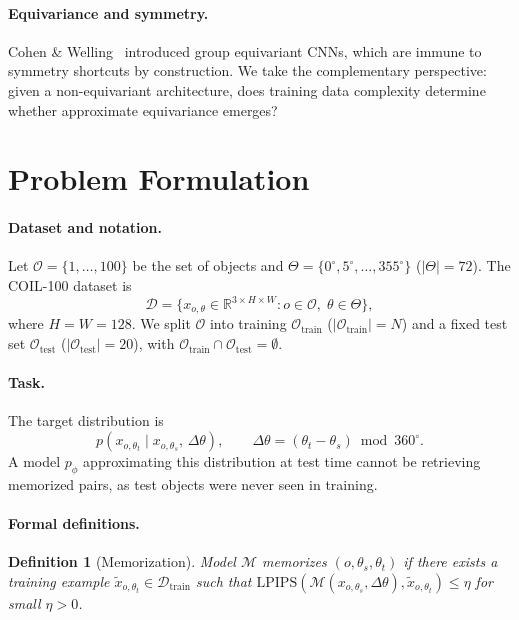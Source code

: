 \documentclass[11pt]{article}
\newtheorem{definition}{Definition}
\newcommand{\R}{\mathbb{R}}
\newcommand{\cO}{\mathcal{O}}
\newcommand{\cD}{\mathcal{D}}
\newcommand{\Dtheta}{\Delta\theta}
\newcommand{\lpips}{\mathrm{LPIPS}}
\begin{document}
\paragraph{Equivariance and symmetry.}
Cohen \& Welling~\cite{cohen2016gcnn} introduced group equivariant CNNs, which
are immune to symmetry shortcuts by construction. We take the complementary
perspective: given a non-equivariant architecture, does training data complexity
determine whether approximate equivariance emerges?

\section{Problem Formulation}
\label{sec:problem}

\paragraph{Dataset and notation.}
Let $\cO = \{1,\ldots,100\}$ be the set of objects and $\Theta =
\{0^{\circ}, 5^{\circ}, \ldots, 355^{\circ}\}$ ($|\Theta| = 72$). The COIL-100
dataset is
\begin{equation}
  \cD = \bigl\{x_{o,\theta} \in \R^{3 \times H \times W} : o \in \cO,\;
  \theta \in \Theta \bigr\},
  \label{eq:dataset}
\end{equation}
where $H = W = 128$. We split $\cO$ into training $\cO_{\mathrm{train}}$
($|\cO_{\mathrm{train}}| = N$) and a fixed test set $\cO_{\mathrm{test}}$
($|\cO_{\mathrm{test}}| = 20$), with $\cO_{\mathrm{train}} \cap
\cO_{\mathrm{test}} = \emptyset$.

\paragraph{Task.}
The target distribution is
\begin{equation}
  p(x_{o,\theta_t} \mid x_{o,\theta_s},\, \Dtheta), \qquad
  \Dtheta = (\theta_t - \theta_s) \bmod 360^{\circ}.
  \label{eq:task}
\end{equation}
A model $p_\phi$ approximating this distribution at test time cannot be
retrieving memorized pairs, as test objects were never seen in training.

\paragraph{Formal definitions.}

\begin{definition}[Memorization]
  \label{def:memo}
  Model $\mathcal{M}$ \emph{memorizes} $(o, \theta_s, \theta_t)$ if there
  exists a training example $\tilde{x}_{o,\theta_t} \in \cD_{\mathrm{train}}$
  such that $\lpips(\mathcal{M}(x_{o,\theta_s},\Dtheta), \tilde{x}_{o,\theta_t})
  \leq \eta$ for small $\eta > 0$.
\end{definition}
\end{document}
